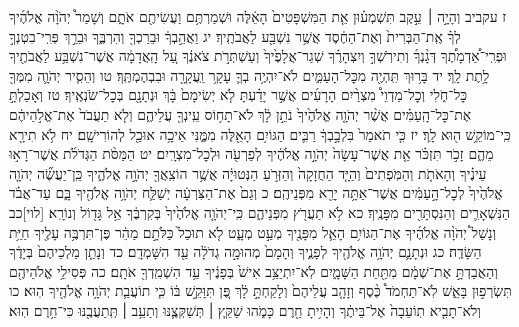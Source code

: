\documentclass[twoside, openany, parskip=half, 11pt]{book}
\begin{document}
ז עקביב וְהָיָ֣ה ׀ עֵ֣קֶב תִּשְׁמְע֗וּן אֵ֤ת הַמִּשְׁפָּטִים֙ הָאֵ֔לֶּה וּשְׁמַרְתֶּ֥ם וַעֲשִׂיתֶ֖ם אֹתָ֑ם וְשָׁמַר֩ יְהֹוָ֨ה אֱלֹהֶ֜יךָ לְךָ֗ אֶֽת־הַבְּרִית֙ וְאֶת־הַחֶ֔סֶד אֲשֶׁ֥ר נִשְׁבַּ֖ע לַאֲבֹתֶֽיךָ׃ יג וַאֲהֵ֣בְךָ֔ וּבֵרַכְךָ֖ וְהִרְבֶּ֑ךָ וּבֵרַ֣ךְ פְּרִֽי־בִטְנְךָ֣ וּפְרִֽי־אַ֠דְמָתֶ֠ךָ דְּגָ֨נְךָ֜ וְתִירֹֽשְׁךָ֣ וְיִצְהָרֶ֗ךָ שְׁגַר־אֲלָפֶ֙יךָ֙ וְעַשְׁתְּרֹ֣ת צֹאנֶ֔ךָ עַ֚ל הָֽאֲדָמָ֔ה אֲשֶׁר־נִשְׁבַּ֥ע לַאֲבֹתֶ֖יךָ לָ֥תֶת לָֽךְ׃ יד בָּר֥וּךְ תִּֽהְיֶ֖ה מִכׇּל־הָעַמִּ֑ים לֹא־יִהְיֶ֥ה בְךָ֛ עָקָ֥ר וַֽעֲקָרָ֖ה וּבִבְהֶמְתֶּֽךָ׃ טו וְהֵסִ֧יר יְהֹוָ֛ה מִמְּךָ֖ כׇּל־חֹ֑לִי וְכׇל־מַדְוֵי֩ מִצְרַ֨יִם הָרָעִ֜ים אֲשֶׁ֣ר יָדַ֗עְתָּ לֹ֤א יְשִׂימָם֙ בָּ֔ךְ וּנְתָנָ֖ם בְּכׇל־שֹׂנְאֶֽיךָ׃ טז וְאָכַלְתָּ֣ אֶת־כׇּל־הָֽעַמִּ֗ים אֲשֶׁ֨ר יְהֹוָ֤ה אֱלֹהֶ֙יךָ֙ נֹתֵ֣ן לָ֔ךְ לֹא־תָח֥וֹס עֵֽינְךָ֖ עֲלֵיהֶ֑ם וְלֹ֤א תַעֲבֹד֙ אֶת־אֱלֹ֣הֵיהֶ֔ם כִּֽי־מוֹקֵ֥שׁ ה֖וּא לָֽךְ׃
יז כִּ֤י תֹאמַר֙ בִּלְבָ֣בְךָ֔ רַבִּ֛ים הַגּוֹיִ֥ם הָאֵ֖לֶּה מִמֶּ֑נִּי אֵיכָ֥ה אוּכַ֖ל לְהוֹרִישָֽׁם׃ יח לֹ֥א תִירָ֖א מֵהֶ֑ם זָכֹ֣ר תִּזְכֹּ֗ר אֵ֤ת אֲשֶׁר־עָשָׂה֙ יְהֹוָ֣ה אֱלֹהֶ֔יךָ לְפַרְעֹ֖ה וּלְכׇל־מִצְרָֽיִם׃ יט הַמַּסֹּ֨ת הַגְּדֹלֹ֜ת אֲשֶׁר־רָא֣וּ עֵינֶ֗יךָ וְהָאֹתֹ֤ת וְהַמֹּֽפְתִים֙ וְהַיָּ֤ד הַחֲזָקָה֙ וְהַזְּרֹ֣עַ הַנְּטוּיָ֔ה אֲשֶׁ֥ר הוֹצִֽאֲךָ֖ יְהֹוָ֣ה אֱלֹהֶ֑יךָ כֵּֽן־יַעֲשֶׂ֞ה יְהֹוָ֤ה אֱלֹהֶ֙יךָ֙ לְכׇל־הָ֣עַמִּ֔ים אֲשֶׁר־אַתָּ֥ה יָרֵ֖א מִפְּנֵיהֶֽם׃ כ וְגַם֙ אֶת־הַצִּרְעָ֔ה יְשַׁלַּ֛ח יְהֹוָ֥ה אֱלֹהֶ֖יךָ בָּ֑ם עַד־אֲבֹ֗ד הַנִּשְׁאָרִ֛ים וְהַנִּסְתָּרִ֖ים מִפָּנֶֽיךָ׃ כא לֹ֥א תַעֲרֹ֖ץ מִפְּנֵיהֶ֑ם כִּֽי־יְהֹוָ֤ה אֱלֹהֶ֙יךָ֙ בְּקִרְבֶּ֔ךָ אֵ֥ל גָּד֖וֹל וְנוֹרָֽא׃ [לוי]כב וְנָשַׁל֩ יְהֹוָ֨ה אֱלֹהֶ֜יךָ אֶת־הַגּוֹיִ֥ם הָאֵ֛ל מִפָּנֶ֖יךָ מְעַ֣ט מְעָ֑ט לֹ֤א תוּכַל֙ כַּלֹּתָ֣ם מַהֵ֔ר פֶּן־תִּרְבֶּ֥ה עָלֶ֖יךָ חַיַּ֥ת הַשָּׂדֶֽה׃ כג וּנְתָנָ֛ם יְהֹוָ֥ה אֱלֹהֶ֖יךָ לְפָנֶ֑יךָ וְהָמָם֙ מְהוּמָ֣ה גְדֹלָ֔ה עַ֖ד הִשָּׁמְדָֽם׃ כד וְנָתַ֤ן מַלְכֵיהֶם֙ בְּיָדֶ֔ךָ וְהַאֲבַדְתָּ֣ אֶת־שְׁמָ֔ם מִתַּ֖חַת הַשָּׁמָ֑יִם לֹֽא־יִתְיַצֵּ֥ב אִישׁ֙ בְּפָנֶ֔יךָ עַ֥ד הִשְׁמִֽדְךָ֖ אֹתָֽם׃ כה פְּסִילֵ֥י אֱלֹהֵיהֶ֖ם תִּשְׂרְפ֣וּן בָּאֵ֑שׁ לֹֽא־תַחְמֹד֩ כֶּ֨סֶף וְזָהָ֤ב עֲלֵיהֶם֙ וְלָקַחְתָּ֣ לָ֔ךְ פֶּ֚ן תִּוָּקֵ֣שׁ בּ֔וֹ כִּ֧י תוֹעֲבַ֛ת יְהֹוָ֥ה אֱלֹהֶ֖יךָ הֽוּא׃ כו וְלֹא־תָבִ֤יא תֽוֹעֵבָה֙ אֶל־בֵּיתֶ֔ךָ וְהָיִ֥יתָ חֵ֖רֶם כָּמֹ֑הוּ שַׁקֵּ֧ץ ׀ תְּשַׁקְּצֶ֛נּוּ וְתַעֵ֥ב ׀ תְּֽתַעֲבֶ֖נּוּ כִּי־חֵ֥רֶם הֽוּא׃
\end{document}
